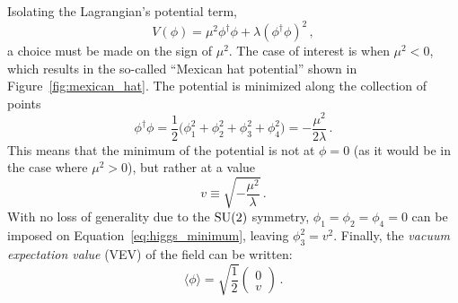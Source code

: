 Isolating the Lagrangian's potential term,
\begin{equation}
  V(\phi) = \mu^2\phi^{\dagger}\phi+\lambda(\phi^{\dagger}\phi)^2\,,
  \label{eq:higgs_potential}
\end{equation}
a choice must be made on the sign of $\mu^2$.
The case of interest is when $\mu^2 < 0$, which results in the so-called ``Mexican hat potential'' shown in Figure~\ref{fig:mexican_hat}.
The potential is minimized along the collection of points
\begin{equation}
  \phi^{\dagger}\phi = \frac{1}{2}\big(\phi_1^2 + \phi_2^2 + \phi_3^2 + \phi_4^2\big) = -\frac{\mu^2}{2\lambda}\,.
  \label{eq:higgs_minimum}
\end{equation}
This means that the minimum of the potential is not at $\phi = 0$ (as it would be in the case where $\mu^2 > 0$), but rather at a value
\begin{equation}
  v \equiv \sqrt{-\frac{\mu^2}{\lambda}}\,.
  \label{eq:higgs_minimum_value}
\end{equation}
With no loss of generality due to the $\textrm{SU}(2)$ symmetry, $\phi_1 = \phi_2 = \phi_4 = 0$ can be imposed on Equation~\ref{eq:higgs_minimum}, leaving $\phi_3^2 = v^2$.
Finally, the \emph{vacuum expectation value} (VEV) of the field can be written:
\begin{equation}
  \langle\phi\rangle = \sqrt{\frac{1}{2}}
  \begin{pmatrix}
  0 \\ v
  \end{pmatrix}\,.
  \label{eq:vev}
\end{equation}

